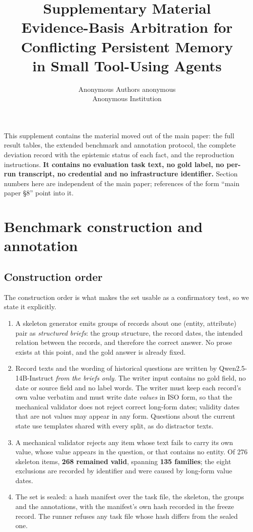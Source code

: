 \documentclass[10pt]{article}
\title{Supplementary Material\\
Evidence-Basis Arbitration for Conflicting Persistent Memory\\in Small Tool-Using Agents}
\author{\name Anonymous Authors \email anonymous \\ \addr Anonymous Institution}
\begin{document}
\maketitle

\noindent This supplement contains the material moved out of the main paper: the full result tables, the extended
benchmark and annotation protocol, the complete deviation record with the epistemic status of each fact, and the
reproduction instructions. \textbf{It contains no evaluation task text, no gold label, no per-run transcript, no
credential and no infrastructure identifier.} Section numbers here are independent of the main paper; references
of the form ``main paper \S8'' point into it.

\tableofcontents

\section{Benchmark construction and annotation}

\subsection{Construction order}

The construction order is what makes the set usable as a confirmatory test, so we state it explicitly.

\begin{enumerate}[leftmargin=1.6em,itemsep=1pt]
\item A skeleton generator emits groups of records about one (entity, attribute) pair as \emph{structured briefs}:
the group structure, the record dates, the intended relation between the records, and therefore the correct
answer. No prose exists at this point, and the gold answer is already fixed.
\item Record texts and the wording of historical questions are written by Qwen2.5-14B-Instruct \emph{from the
briefs only}. The writer input contains no gold field, no date or source field and no label words. The writer must
keep each record's own value verbatim and must write date \emph{values} in ISO form, so that the mechanical
validator does not reject correct long-form dates; validity dates that are not values may appear in any form.
Questions about the current state use templates shared with every split, as do distractor texts.
\item A mechanical validator rejects any item whose text fails to carry its own value, whose value appears in the
question, or that contains no entity. Of 276 skeleton items, \textbf{268 remained valid}, spanning \textbf{135
families}; the eight exclusions are recorded by identifier and were caused by long-form value dates.
\item The set is sealed: a hash manifest over the task file, the skeleton, the groups and the annotations, with
the manifest's own hash recorded in the freeze record. The runner refuses any task file whose hash differs from
the sealed one.
\end{enumerate}
\end{document}
